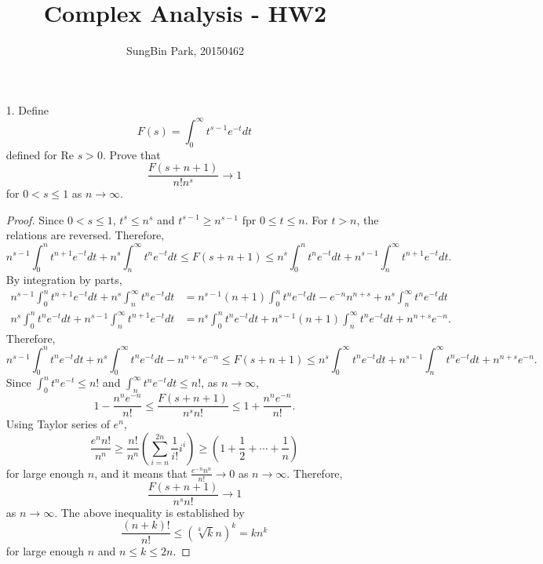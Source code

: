 \documentclass{article}
\begin{document}
\title{Complex Analysis - HW2}
\author{SungBin Park, 20150462} 

\maketitle
\begin{enumerate}
\item[1.] Define
\begin{equation*}
F(s)=\int_0^\infty t^{s-1}e^{-t} dt
\end{equation*}
defined for $\text{Re }s>0$. Prove that
\begin{equation*}
\frac{F(s+n+1)}{n!n^s}\rightarrow 1
\end{equation*}
for $0< s\leq 1$ as $n\rightarrow \infty$.
\begin{proof}
Since $0<s\leq 1$, $t^s\leq n^s$ and $t^{s-1}\geq n^{s-1}$ fpr $0\leq t\leq n$. For $t>n$, the relations are reversed. Therefore,
\begin{equation*}
n^{s-1}\int_0^n t^{n+1} e^{-t} dt+n^{s}\int_n^\infty t^n e^{-t}dt \leq F(s+n+1)\leq n^s\int_0^n t^n e^{-t} dt+n^{s-1}\int_n^\infty t^{n+1} e^{-t}dt .
\end{equation*}
By integration by parts,
\begin{equation*}
\begin{split}
n^{s-1}\int_0^n t^{n+1} e^{-t} dt+n^{s}\int_n^\infty t^n e^{-t}dt &= n^{s-1}(n+1)\int_0^n t^{n} e^{-t} dt-e^{-n} n^{n+s}+n^{s}\int_n^\infty t^n e^{-t}dt \\
n^s\int_0^n t^n e^{-t} dt+n^{s-1}\int_n^\infty t^{n+1} e^{-t}dt &= n^s\int_0^n t^n e^{-t} dt+n^{s-1}(n+1)\int_n^\infty t^{n} e^{-t}dt + n^{n+s}e^{-n}.
\end{split}
\end{equation*}
Therefore,
\begin{equation*}
n^{s-1}\int_0^n t^{n} e^{-t} dt+n^{s}\int_0^\infty t^n e^{-t}dt -n^{n+s}e^{-n}\leq F(s+n+1)\leq n^s\int_0^\infty t^n e^{-t} dt+n^{s-1}\int_n^\infty t^{n} e^{-t}dt+n^{n+s}e^{-n}.
\end{equation*}
Since $\int_0^n t^ne^{-t}\leq n!$ and $\int_n^\infty t^ne^{-t}dt\leq n!$, as $n\rightarrow \infty$,
\begin{equation*}
1-\frac{n^{n}e^{-n}}{n!}\leq \frac{F(s+n+1)}{n^sn!}\leq 1+\frac{n^{n}e^{-n}}{n!}.
\end{equation*}
Using Taylor series of $e^n$,
\begin{equation*}
\frac{e^n n!}{n^n}\geq \frac{n!}{n^n}\left(\sum\limits_{i=n}^{2n} \frac{1}{i!}i^i\right)\geq \left(1+\frac{1}{2}+\cdots+\frac{1}{n}\right)
\end{equation*}
for large enough $n$, and it means that $\frac{e^{-n}n^n}{n!}\rightarrow 0$ as $n\rightarrow \infty$. Therefore,
\begin{equation*}
\frac{F(s+n+1)}{n^sn!}\rightarrow 1
\end{equation*}
as $n\rightarrow \infty$. The above inequality is established by
\begin{equation*}
\frac{(n+k)!}{n!}\leq (\sqrt[k]{k}n)^k=kn^k
\end{equation*}
for large enough $n$ and $n\leq k\leq 2n$.
\end{proof}


\end{enumerate}
\end{document}
